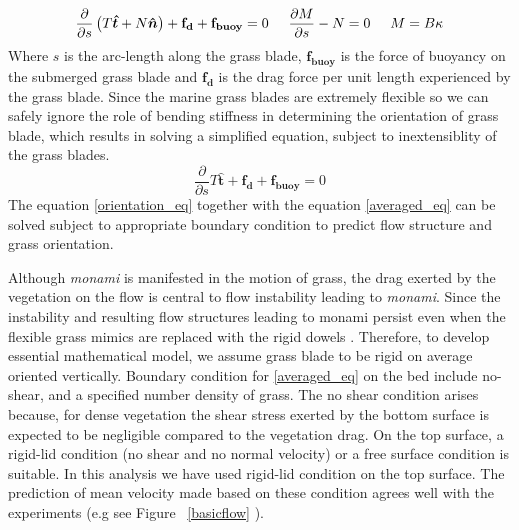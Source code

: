 \documentclass[12pt]{report}   %
\newcommand{\bn}{{\boldsymbol{\hat{n}}}}
\newcommand{\bt}{{\boldsymbol{\hat{t}}}}
\newcommand{\monami}{\textit{monami}}
\begin{document}
\begin{equation}
 \frac{\partial}{\partial s}\left( T\bt + N\bn \right)+\mathbf{f_d}+\mathbf{f_{buoy}} =0 \hspace{.5cm} \frac{\partial M}{\partial s} -N =0 \hspace{.5cm}  M = B\kappa
\end{equation}
Where $s$ is the arc-length along the grass blade, $\mathbf{f_{buoy}}$ is the force of buoyancy on the submerged grass blade and $\mathbf{f_{d}}$ is the drag force per unit length experienced by the grass blade. Since the marine grass blades are extremely flexible so we can safely ignore the role of bending stiffness in determining the orientation of grass blade,  which results in solving a simplified equation, subject to inextensiblity of the grass blades. 
\begin{equation}
  \frac{\partial}{\partial s} T\bt +\mathbf{f_d}+\mathbf{f_{buoy}} =0
  \label{orientation_eq}
\end{equation}
The equation \eqref{orientation_eq} together with the equation \eqref{averaged_eq} can be solved subject to appropriate boundary condition to predict flow structure and grass orientation.

Although {\monami} is manifested in the motion of grass, the drag exerted by the vegetation on the flow is central to flow instability leading to {\monami}. Since the instability and resulting flow structures leading to monami persist even when the flexible grass mimics are replaced with the rigid dowels \cite{Ghisal02,Nepf06}. Therefore, to develop essential mathematical model, we assume grass blade to be rigid on average oriented vertically.
Boundary condition for \eqref{averaged_eq} on the bed include no-shear, and a specified number density of grass. The no shear condition arises because, for dense vegetation the shear stress exerted by the bottom surface is expected to be negligible compared to the vegetation drag. On the top surface, a rigid-lid condition (no shear and no normal velocity) or a free surface condition is suitable. In this analysis we have used rigid-lid condition on the top surface. The prediction of mean velocity made based on these condition agrees well with the experiments (e.g see Figure ~\ref{basicflow} ). 
%
\clearpage{\pagestyle{empty}\cleardoublepage}
\end{document}
